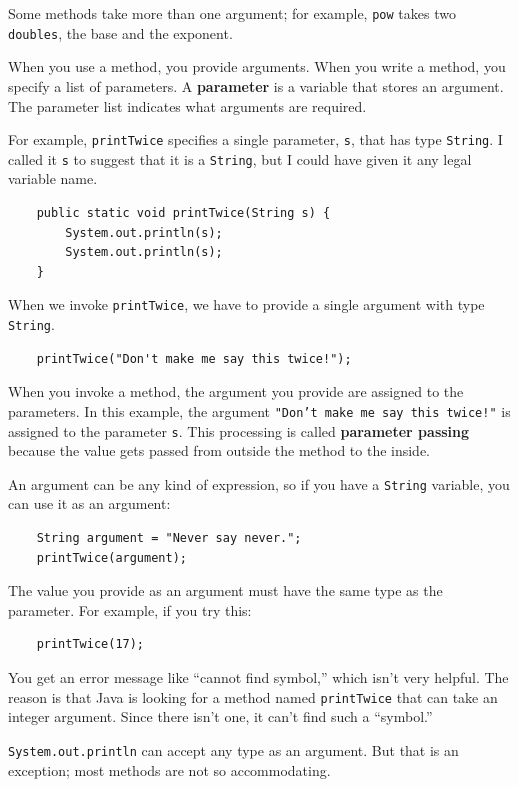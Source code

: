 \documentclass[12pt]{book}
\theoremstyle{exercise}
\begin{document}
Some methods take more than one argument; for example, {\tt pow}
takes two {\tt doubles}, the base and the exponent.

When you use a method, you provide arguments.  When you write
a method, you specify a list of parameters.  A {\bf parameter}
is a variable that stores an argument.  The parameter list
indicates what arguments are required.

For example, {\tt printTwice} specifies a single parameter,
{\tt s}, that has type {\tt String}.  I called it {\tt s} to
suggest that it is a {\tt String}, but I could have given it
any legal variable name.

\begin{lstlisting}
    public static void printTwice(String s) {
        System.out.println(s);
        System.out.println(s);
    }
\end{lstlisting}
%
When we invoke {\tt printTwice}, we have to provide
a single argument with type {\tt String}.

\begin{lstlisting}
    printTwice("Don't make me say this twice!");
\end{lstlisting}

When you invoke a method, the argument you provide are assigned to the
parameters.  In this example, the argument {\tt "Don't make me say this
  twice!"} is assigned to the parameter {\tt s}.  This processing
is called {\bf parameter passing} because the value gets passed
from outside the method to the inside.

An argument can be any kind of expression, so if you
have a {\tt String} variable, you can use it as an argument:

\begin{lstlisting}
    String argument = "Never say never.";
    printTwice(argument);
\end{lstlisting}
%
The value you provide as an argument must have the same type as
the parameter.  For example, if you try this:

\begin{lstlisting}
    printTwice(17);
\end{lstlisting}
%
You get an error message like ``cannot find symbol,'' which isn't very
helpful.  The reason is that Java is looking for a method named
{\tt printTwice} that can take an integer argument.  Since there
isn't one, it can't find such a ``symbol.''

{\tt System.out.println} can accept any
type as an argument.  But that is an exception; most methods
are not so accommodating.
\end{document}
